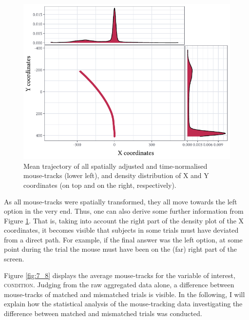 \begin{figure}
    \centering
    \includegraphics[]{figures/fig7.7.pdf}
    \caption{Mean trajectory of all spatially adjusted and time-normalised mouse-tracks (lower left), and density distribution of X and Y coordinates (on top and on the right, respectively).}
    \label{fig:7_7}
\end{figure}

As all mouse-tracks were spatially transformed, they all move towards the left option in the very end. Thus, one can also derive some further information from Figure \ref{fig:7_7}. That is, taking into account the right part of the density plot of the X coordinates, it becomes visible that subjects in some trials must have deviated from a direct path. For example, if the final answer was the left option, at some point during the trial the mouse must have been on the (far) right part of the screen.

Figure \ref{fig:7_8} displays the average mouse-tracks for the variable of interest, \textsc{condition}. Judging from the raw aggregated data alone, a difference between mouse-tracks of matched and mismatched trials is visible. In the following, I will explain how the statistical analysis of the mouse-tracking data investigating the difference between matched and mismatched trials was conducted.

